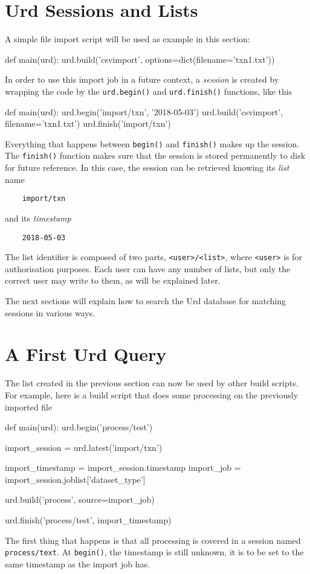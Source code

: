 \section{Urd Sessions and Lists}
A simple file import script will be used as example in this section:
\begin{python}
def main(urd):
    urd.build('csvimport', options=dict(filename='txn1.txt'))
\end{python}
In order to use this import job in a future context,
a \textsl{session} is created by wrapping the code by
the \texttt{urd.begin()} and \texttt{urd.finish()} functions, like this
\begin{python}
def main(urd):
    urd.begin('import/txn', '2018-05-03')
    urd.build('csvimport', filename='txn1.txt')
    urd.finish('import/txn')
\end{python}
Everything that happens between \texttt{begin()} and \texttt{finish()}
makes up the session.  The \texttt{finish()} function makes sure that
the session is stored permanently to disk for future reference.  In
this case, the session can be retrieved knowing its \textsl{list} name
\begin{verbatim}
    import/txn
\end{verbatim}
and its \textsl{timestamp}
\begin{verbatim}
    2018-05-03
\end{verbatim}
The list identifier is composed of two parts, \texttt{<user>/<list>}, where
\texttt{<user>} is for authorisation purposes.  Each user can
have any number of lists, but only the correct user may write to them,
as will be explained later.

The next sections will explain how to search the Urd database for
matching sessions in various ways.



\section{A First Urd Query}
The list created in the previous section can now be used by other
build scripts.  For example, here is a build script that does some
processing on the previously imported file
\begin{python}
def main(urd):
    urd.begin('process/test')

    import_session = urd.latest('import/txn')

    import_timestamp = import_session.timestamp
    import_job       = import_session.joblist['dataset_type']

    urd.build('process', source=import_job)

    urd.finish('process/test', import_timestamp)
\end{python}
The first thing that happens is that all processing is covered in a
session named \texttt{process/text}.  At \texttt{begin()}, the
timestamp is still unknown, it is to be set to the same timestamp as
the import job has.

